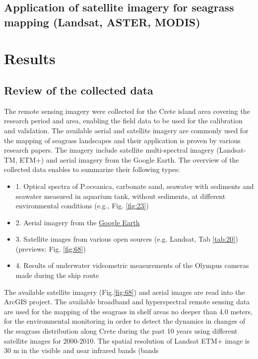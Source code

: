 \documentclass[10pt, a4paper]{article}
\begin{document}
\subsection{Application of satellite imagery for seagrass mapping (Landsat, ASTER, MODIS)}

\pagebreak
\section{Results}

\subsection{Review of the collected data}
The remote sensing imagery were collected for the Crete island area covering the research period and
area, enabling the field data to be used for the calibration and validation. The available aerial and
satellite imagery are commonly used for the mapping of seagrass landscapes and their application is
proven by various research papers. The imagery include satellite multi-spectral imagery (Landsat-TM,
ETM+) and aerial imagery from the Google Earth.
The overview of the collected data enables to summarize their following types:
\begin{itemize}
\item[] 1. Optical spectra of P.oceanica, carbonate sand, seawater with sediments and seawater measured in aquarium tank, without sediments, at different environmental conditions (e.g., Fig. \ref{fig:23})
\item[]2. Aerial imagery from the \href{http://www.google.com/earth/index.html}{Google Earth}
\item[]3. Satellite images from various open sources (e.g. Landsat, Tab \ref{tab:20}) (previews: Fig. \ref{fig:68})
\item[]4. Results of underwater videometric measurements of the Olympus cameras made during the ship route
\end{itemize}
The available satellite imagery (Fig.\ref{fig:68}) and aerial images are read into the ArcGIS project.
The available broadband and hyperspectral remote sensing data are used for the mapping of the
seagrass in shelf areas no deeper than 4.0 meters, for the environmental monitoring in order to detect
the dynamics in changes of the seagrass distribution along Crete during the past 10 years using
different satellite images for 2000-2010.
The spatial resolution of Landsat ETM+ image is 30 m in the visible and near infrared bands (bands
\end{document}
